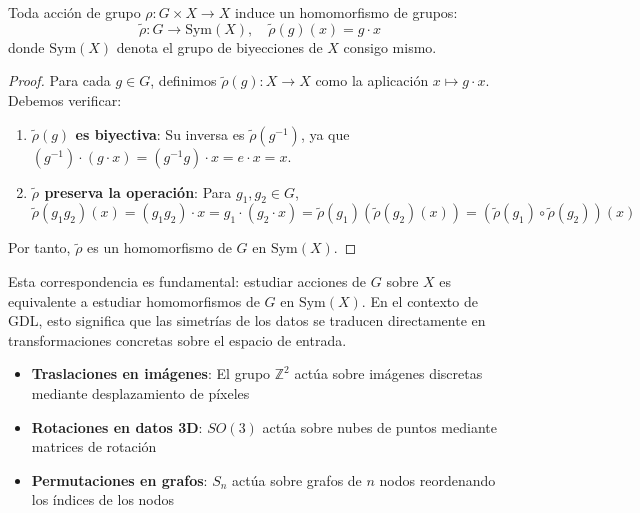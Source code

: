 \begin{proposition}\label{prop:acciones_homomorfismos}
Toda acción de grupo $\rho: G \times X \rightarrow X$ induce un homomorfismo de grupos:
\begin{equation}
\tilde{\rho}: G \rightarrow \text{Sym}(X), \quad \tilde{\rho}(g)(x) = g \cdot x
\end{equation}
donde $\text{Sym}(X)$ denota el grupo de biyecciones de $X$ consigo mismo.
\end{proposition}

\begin{proof}
Para cada $g \in G$, definimos $\tilde{\rho}(g): X \rightarrow X$ como la aplicación $x \mapsto g \cdot x$. Debemos verificar:
\begin{enumerate}
    \item \textbf{$\tilde{\rho}(g)$ es biyectiva}: Su inversa es $\tilde{\rho}(g^{-1})$, ya que $(g^{-1}) \cdot (g \cdot x) = (g^{-1}g) \cdot x = e \cdot x = x$.
    \item \textbf{$\tilde{\rho}$ preserva la operación}: Para $g_1, g_2 \in G$,
    \begin{equation}
    \tilde{\rho}(g_1 g_2)(x) = (g_1 g_2) \cdot x = g_1 \cdot (g_2 \cdot x) = \tilde{\rho}(g_1)(\tilde{\rho}(g_2)(x)) = (\tilde{\rho}(g_1) \circ \tilde{\rho}(g_2))(x)
    \end{equation}
\end{enumerate}
Por tanto, $\tilde{\rho}$ es un homomorfismo de $G$ en $\text{Sym}(X)$.
\end{proof}

Esta correspondencia es fundamental: estudiar acciones de $G$ sobre $X$ es equivalente a estudiar homomorfismos de $G$ en $\text{Sym}(X)$. En el contexto de \gls{GDL}, esto significa que las simetrías de los datos se traducen directamente en transformaciones concretas sobre el espacio de entrada.

\begin{example}\label{ex:acciones_grupo_dl}
\leavevmode
\begin{itemize}
    \item \textbf{Traslaciones en imágenes}: El grupo $\mathbb{Z}^2$ actúa sobre imágenes discretas mediante desplazamiento de píxeles
    \item \textbf{Rotaciones en datos 3D}: $SO(3)$ actúa sobre nubes de puntos mediante matrices de rotación
    \item \textbf{Permutaciones en grafos}: $S_n$ actúa sobre grafos de $n$ nodos reordenando los índices de los nodos
\end{itemize}
\end{example}

